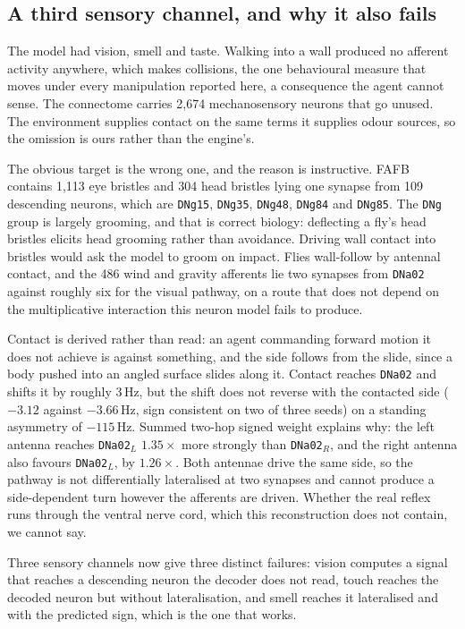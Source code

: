 \documentclass[10pt,twoside]{article}
\newcommand{\cell}[1]{\texttt{#1}}
\begin{document}
\subsection{A third sensory channel, and why it also fails}
\label{sec:touch}

The model had vision, smell and taste. Walking into a wall produced no
afferent activity anywhere, which makes collisions, the one behavioural
measure that moves under every manipulation reported here, a consequence the
agent cannot sense. The connectome carries 2{,}674 mechanosensory neurons
that go unused. The environment supplies contact on the same terms it supplies
odour sources, so the omission is ours rather than the engine's.

The obvious target is the wrong one, and the reason is instructive. FAFB
contains 1{,}113 eye bristles and 304 head bristles lying one synapse from 109
descending neurons, which are \cell{DNg15}, \cell{DNg35}, \cell{DNg48},
\cell{DNg84} and \cell{DNg85}. The \cell{DNg} group is largely grooming, and
that is correct biology: deflecting a fly's head bristles elicits head
grooming rather than avoidance. Driving wall contact into bristles would ask
the model to groom on impact. Flies wall-follow by antennal contact, and the
486 wind and gravity afferents lie two synapses from \cell{DNa02} against
roughly six for the visual pathway, on a route that does not depend on the
multiplicative interaction this neuron model fails to produce.

Contact is derived rather than read: an agent commanding forward motion it
does not achieve is against something, and the side follows from the slide,
since a body pushed into an angled surface slides along it. Contact reaches
\cell{DNa02} and shifts it by roughly 3\,Hz, but the shift does not reverse
with the contacted side ($-3.12$ against $-3.66$\,Hz, sign consistent on two
of three seeds) on a standing asymmetry of $-115$\,Hz. Summed two-hop signed
weight explains why: the left antenna reaches \cell{DNa02}$_L$ $1.35\times$
more strongly than \cell{DNa02}$_R$, and the right antenna also favours
\cell{DNa02}$_L$, by $1.26\times$. Both antennae drive the same side, so the
pathway is not differentially lateralised at two synapses and cannot produce a
side-dependent turn however the afferents are driven. Whether the real reflex
runs through the ventral nerve cord, which this reconstruction does not
contain, we cannot say.

Three sensory channels now give three distinct failures: vision computes a
signal that reaches a descending neuron the decoder does not read, touch
reaches the decoded neuron but without lateralisation, and smell reaches it
lateralised and with the predicted sign, which is the one that works.
\end{document}
